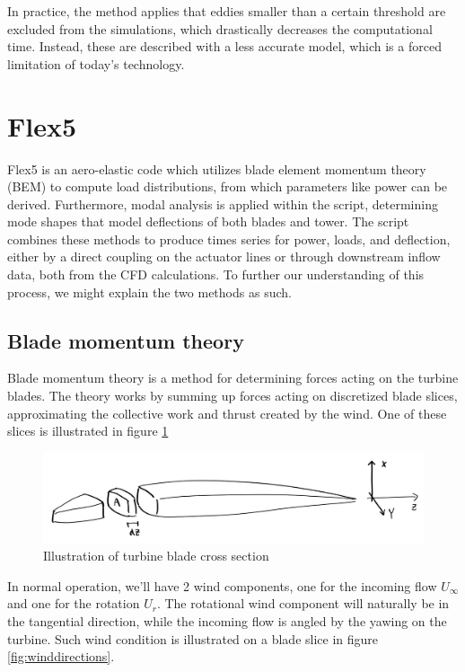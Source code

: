 In practice, the method applies that eddies smaller than a certain threshold are excluded from the simulations, which drastically decreases the computational time. Instead, these are described with a less accurate model, which is a forced limitation of today's technology.

\section{Flex5}

Flex5 is an aero-elastic code which utilizes blade element momentum theory (BEM) \cite{BEM} to compute load distributions, from which parameters like power can be derived. Furthermore, modal analysis \cite{modal} is applied within the script, determining mode shapes that model deflections of both blades and tower. The script combines these methods to produce times series for power, loads, and deflection, either by a direct coupling on the actuator lines or through downstream inflow data, both from the CFD calculations. To further our understanding of this process, we might explain the two methods as such.

\subsection{Blade momentum theory}
\label{sec:blademomentum}

Blade momentum theory \cite{BEM} is a method for determining forces acting on the turbine blades. The theory works by summing up forces acting on discretized blade slices, approximating the collective work and thrust created by the wind. One of these slices is illustrated in figure \ref{fig:bladeslice}

\begin{figure}[H]
    \centering
    \includegraphics[scale=0.25]{Illustrations/BEMwingcut.jpg}
    \caption{Illustration of turbine blade cross section}
    \label{fig:bladeslice}
\end{figure}

In normal operation, we'll have 2 wind components, one for the incoming flow $U_\infty$ and one for the rotation $U_r$. The rotational wind component will naturally be in the tangential direction, while the incoming flow is angled by the yawing on the turbine. Such wind condition is illustrated on a blade slice in figure \ref{fig:winddirections}.

